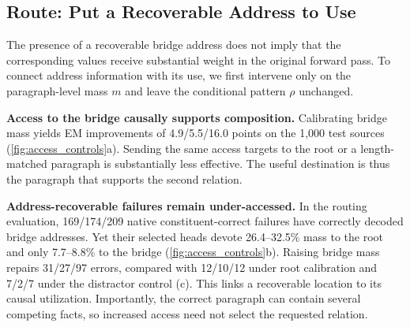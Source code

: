 \subsection{Route: Put a Recoverable Address to Use}\label{sec:routing_results}
The presence of a recoverable bridge address does not imply that the corresponding values receive substantial weight in the original forward pass. To connect address information with its use, we first intervene only on the paragraph-level mass $m$ and leave the conditional pattern $\rho$ unchanged.

\textbf{Access to the bridge causally supports composition.} Calibrating bridge mass yields EM improvements of 4.9/5.5/16.0 points on the 1,000 test sources (\cref{fig:access_controls}a). Sending the same access targets to the root or a length-matched paragraph is substantially less effective. The useful destination is thus the paragraph that supports the second relation.

\textbf{Address-recoverable failures remain under-accessed.} In the routing evaluation, 169/174/209 native constituent-correct failures have correctly decoded bridge addresses. Yet their selected heads devote 26.4--32.5\% mass to the root and only 7.7--8.8\% to the bridge (\cref{fig:access_controls}b). Raising bridge mass repairs 31/27/97 errors, compared with 12/10/12 under root calibration and 7/2/7 under the distractor control (c). This links a recoverable location to its causal utilization. Importantly, the correct paragraph can contain several competing facts, so increased access need not select the requested relation.
